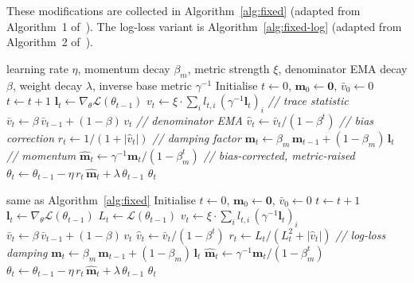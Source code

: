 \documentclass{article}
\newcommand{\loss}{\mathcal{L}}
\newcommand{\vecb}[1]{\boldsymbol{#1}}
\begin{document}
\medskip\noindent
These modifications are collected in Algorithm~\ref{alg:fixed}
(adapted from Algorithm~1 of~\cite{harvey2025}).
The log-loss variant is Algorithm~\ref{alg:fixed-log}
(adapted from Algorithm~2 of~\cite{harvey2025}).

\begin{algorithm}[H]
\caption{Fixed diagonal metric (plain embedding, $f=\loss$)}
\label{alg:fixed}
\begin{algorithmic}[1]
\REQUIRE learning rate $\eta$, momentum decay $\beta_m$, metric strength $\xi$, denominator EMA decay $\beta$, weight decay $\lambda$, inverse base metric $\gamma^{-1}$
\STATE Initialise $t \leftarrow 0$, $\vecb{m}_0 \leftarrow \vecb{0}$, $\bar{v}_0 \leftarrow 0$
\STATE $t \leftarrow t + 1$
\STATE $\vecb{l}_t \leftarrow \nabla_\theta \loss(\theta_{t-1})$
\STATE $v_t \leftarrow \xi \cdot \sum_i l_{t,i}\,(\gamma^{-1}\vecb{l}_t)_i$
    \hfill{\footnotesize\textit{// trace statistic}}
\STATE $\bar{v}_t \leftarrow \beta\,\bar{v}_{t-1} + (1-\beta)\,v_t$
    \hfill{\footnotesize\textit{// denominator EMA}}
\STATE $\hat{v}_t \leftarrow \bar{v}_t / (1 - \beta^t)$
    \hfill{\footnotesize\textit{// bias correction}}
\STATE $r_t \leftarrow 1/(1 + |\hat{v}_t|)$
    \hfill{\footnotesize\textit{// damping factor}}
\STATE $\vecb{m}_t \leftarrow \beta_m\,\vecb{m}_{t-1} + (1-\beta_m)\,\vecb{l}_t$
    \hfill{\footnotesize\textit{// momentum}}
\STATE $\hat{\vecb{m}}_t \leftarrow \gamma^{-1}\vecb{m}_t / (1 - \beta_m^t)$
    \hfill{\footnotesize\textit{// bias-corrected, metric-raised}}
\STATE $\theta_t \leftarrow \theta_{t-1} - \eta\,r_t\,\hat{\vecb{m}}_t + \lambda\,\theta_{t-1}$
\ENDWHILE
\RETURN $\theta_t$
\end{algorithmic}
\end{algorithm}

\begin{algorithm}[H]
\caption{Fixed diagonal metric (log-loss embedding, $f=\log\loss$, requires $\loss>0$)}
\label{alg:fixed-log}
\begin{algorithmic}[1]
\REQUIRE same as Algorithm~\ref{alg:fixed}
\STATE Initialise $t \leftarrow 0$, $\vecb{m}_0 \leftarrow \vecb{0}$, $\bar{v}_0 \leftarrow 0$
\STATE $t \leftarrow t + 1$
\STATE $\vecb{l}_t \leftarrow \nabla_\theta \loss(\theta_{t-1})$
\STATE $L_t \leftarrow \loss(\theta_{t-1})$
\STATE $v_t \leftarrow \xi \cdot \sum_i l_{t,i}\,(\gamma^{-1}\vecb{l}_t)_i$
\STATE $\bar{v}_t \leftarrow \beta\,\bar{v}_{t-1} + (1-\beta)\,v_t$
\STATE $\hat{v}_t \leftarrow \bar{v}_t / (1 - \beta^t)$
\STATE $r_t \leftarrow L_t / (L_t^2 + |\hat{v}_t|)$
    \hfill{\footnotesize\textit{// log-loss damping}}
\STATE $\vecb{m}_t \leftarrow \beta_m\,\vecb{m}_{t-1} + (1-\beta_m)\,\vecb{l}_t$
\STATE $\hat{\vecb{m}}_t \leftarrow \gamma^{-1}\vecb{m}_t / (1 - \beta_m^t)$
\STATE $\theta_t \leftarrow \theta_{t-1} - \eta\,r_t\,\hat{\vecb{m}}_t + \lambda\,\theta_{t-1}$
\ENDWHILE
\RETURN $\theta_t$
\end{algorithmic}
\end{algorithm}
\end{document}
